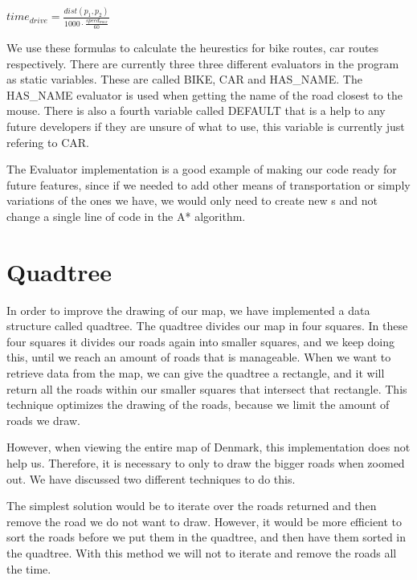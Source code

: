 \begin{center}
$
time_{drive}=\frac{dist(p_{1},p_{2})}{1000\cdot \frac {speed_{max}}{60}}
$
\end{center}

We use these formulas to calculate the heurestics for bike routes, car routes respectively.
There are currently three three different evaluators in the program as static variables. These
are called BIKE, CAR and HAS\_NAME. The HAS\_NAME evaluator is used when getting
the name of the road closest to the mouse. There is also a fourth variable called DEFAULT that is a help to
any future developers if they are unsure of what to use, this variable is currently just refering
to CAR. 

The Evaluator implementation is a good example of making our code ready for future features, 
since if we needed to add other means of transportation or simply variations of the ones 
we have, we would only need to create new s and not change 
a single line of code in the A* algorithm.

\section{Quadtree}
\label{IMPL-QT}
In order to improve the drawing of our map, we have implemented a data structure
called quadtree. The quadtree divides our map in four squares. In these four squares
it divides our roads again into smaller squares, and we keep doing this, until we reach
an amount of roads that is manageable.
When we want to retrieve data from the map, we can give the quadtree a
rectangle, and it will return all the roads within our smaller squares that intersect
that rectangle. This technique optimizes the drawing of the roads, because we
limit the amount of roads we draw.

However, when viewing the entire map of Denmark, this implementation does not help
us. Therefore, it is necessary to only to draw the bigger roads when zoomed out. We
have discussed two different techniques to do this.

The simplest solution would be to iterate over the roads returned and then
remove the road we do not want to draw. However, it would be more efficient to sort the
roads before we put them in the quadtree, and then have them sorted in the quadtree.
With this method we will not to iterate and remove the roads all the time.

